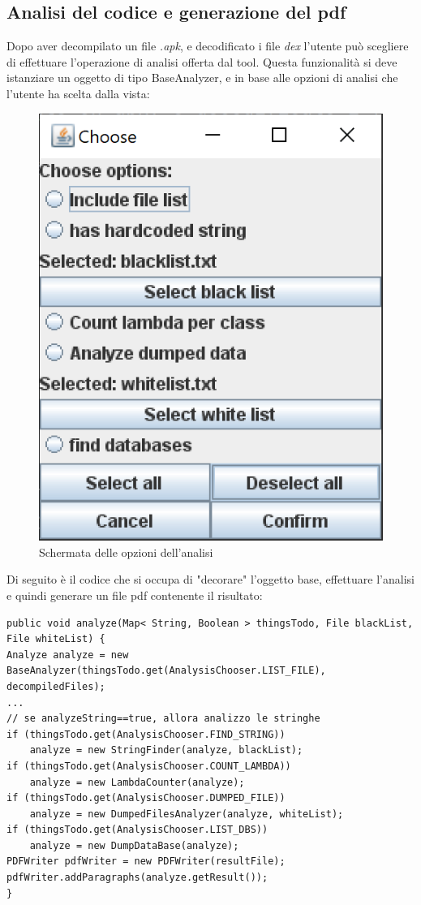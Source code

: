 \subsection{Analisi del codice e generazione del pdf}\label{subsec:analisi-del-codice-e-generazione-del-pdf}
Dopo aver decompilato un file \textit{.apk}, e decodificato i file \textit{dex} l'utente può scegliere di effettuare l'operazione di analisi offerta dal tool.
Questa funzionalità si deve istanziare un oggetto di tipo BaseAnalyzer, e in base alle opzioni di analisi che l'utente ha scelta dalla vista:
\begin{figure}[H]
    \centering
    \includegraphics{./immagini/tool/analysis_chooser.png}
    \caption{Schermata delle opzioni dell'analisi}\label{fig:analysis_chooser}
\end{figure}
Di seguito è il codice che si occupa di "decorare" l'oggetto base, effettuare l'analisi e quindi generare un file pdf contenente il risultato:

\begin{lstlisting}[caption={Decorator},label={lst:analyze}]
public void analyze(Map< String, Boolean > thingsTodo, File blackList, File whiteList) {
Analyze analyze = new BaseAnalyzer(thingsTodo.get(AnalysisChooser.LIST_FILE), decompiledFiles);
...
// se analyzeString==true, allora analizzo le stringhe
if (thingsTodo.get(AnalysisChooser.FIND_STRING))
    analyze = new StringFinder(analyze, blackList);
if (thingsTodo.get(AnalysisChooser.COUNT_LAMBDA))
    analyze = new LambdaCounter(analyze);
if (thingsTodo.get(AnalysisChooser.DUMPED_FILE))
    analyze = new DumpedFilesAnalyzer(analyze, whiteList);
if (thingsTodo.get(AnalysisChooser.LIST_DBS))
    analyze = new DumpDataBase(analyze);
PDFWriter pdfWriter = new PDFWriter(resultFile);
pdfWriter.addParagraphs(analyze.getResult());
}
\end{lstlisting}

